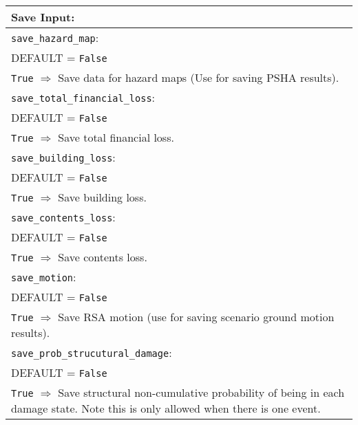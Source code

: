 \documentclass[a4paper, 12pt]{report}
\begin{document}
\vspace{2em}
\begin{tabular}{|p{\textwidth}|}
\hline
\vspace{0.3em} \noindent \Large \textbf{Save Input:} \normalsize \\
\hline \vspace{0.1em} \texttt{save\_hazard\_map}: \\
DEFAULT = \texttt{False} \\
\texttt{True} $\Rightarrow$ Save data for hazard maps (Use for saving PSHA results). \\
\hline \vspace{0.1em} \texttt{save\_total\_financial\_loss}: \\
DEFAULT = \texttt{False} \\
\texttt{True} $\Rightarrow$ Save total financial loss. \\
 \hline
\vspace{0.1em} \texttt{save\_building\_loss}: \\
DEFAULT = \texttt{False} \\
\texttt{True} $\Rightarrow$ Save building loss. \\
 \hline
\vspace{0.1em} \texttt{save\_contents\_loss}: \\
DEFAULT = \texttt{False} \\
 \texttt{True} $\Rightarrow$ Save contents loss. \\
\hline \vspace{0.1em} \texttt{save\_motion}: \\
DEFAULT = \texttt{False} \\
\texttt{True} $\Rightarrow$ Save RSA motion (use for saving scenario ground motion results). \\
\hline \vspace{0.1em} \texttt{save\_prob\_strucutural\_damage}: \\
DEFAULT = \texttt{False} \\
\texttt{True} $\Rightarrow$ Save structural non-cumulative
probability of being in each
damage state.  Note this is only allowed when there is one event. \\
\hline
 \end{tabular}
\end{document}
